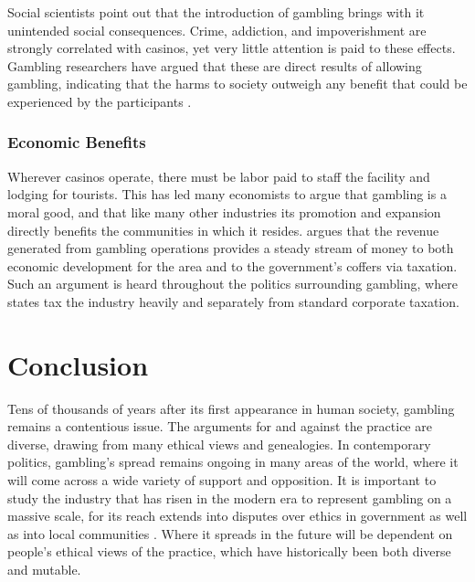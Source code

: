 \documentclass[american]{../../../coursework}
\begin{document}
Social scientists point out that the introduction of gambling brings with it unintended social consequences. Crime, addiction, and impoverishment are strongly correlated with casinos, yet very little attention is paid to these effects. Gambling researchers have argued that these are direct results of allowing gambling, indicating that the harms to society outweigh any benefit that could be experienced by the participants \parencite{Sto99}.

\subsubsection{Economic Benefits}

Wherever casinos operate, there must be labor paid to staff the facility and lodging for tourists. This has led many economists to argue that gambling is a moral good, and that like many other industries its promotion and expansion directly benefits the communities in which it resides. \textcite{Gil12} argues that the revenue generated from gambling operations provides a steady stream of money to both economic development for the area and to the government's coffers via taxation. Such an argument is heard throughout the politics surrounding gambling, where states tax the industry heavily and separately from standard corporate taxation.

\section{Conclusion}

Tens of thousands of years after its first appearance in human society, gambling remains a contentious issue. The arguments for and against the practice are diverse, drawing from many ethical views and genealogies. In contemporary politics, gambling's spread remains ongoing in many areas of the world, where it will come across a wide variety of support and opposition. It is important to study the industry that has risen in the modern era to represent gambling on a massive scale, for its reach extends into disputes over ethics in government \parencite{Kin98} as well as into local communities \parencite{Sto99,Gil12}. Where it spreads in the future will be dependent on people's ethical views of the practice, which have historically been both diverse and mutable.

\printbibliography
\end{document}

